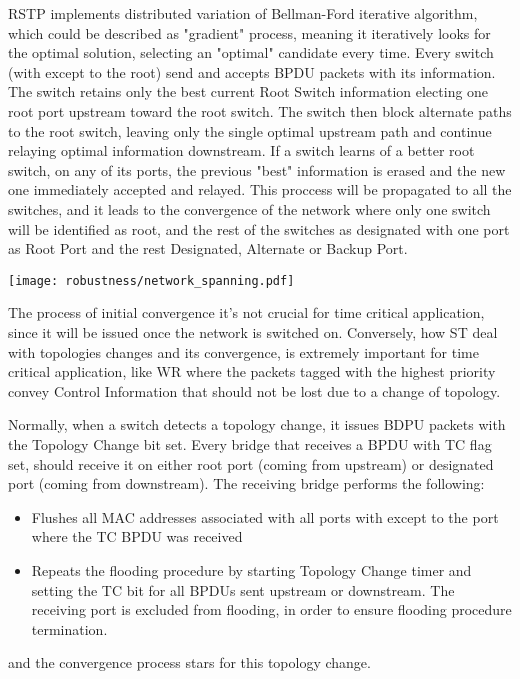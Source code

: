 RSTP implements distributed variation of Bellman-Ford iterative
algorithm, which could be described as "gradient" process, meaning it iteratively looks for the
optimal solution, selecting an "optimal" candidate every time. Every switch
(with except to the root) send and  accepts BPDU packets
with its information. The switch retains only the best current Root Switch
information electing one root port upstream toward the root switch. The switch
then block alternate paths to the root switch, leaving only the single optimal
upstream path and continue relaying optimal information downstream. If a switch
learns of a better root switch, on any of its ports, the previous "best"
information is erased and the new one immediately accepted and relayed. This
proccess will be propagated to all the switches, and it leads to the convergence
of the network where only one switch will be identified as root, and the rest of
the switches as designated with one port as Root Port and the rest Designated,
Alternate or Backup Port.


\begin{center}
        \texttt{[image: robustness/network\_spanning.pdf]}
        \label{fig:free_loops}
\end{center}

The process of initial convergence it's not crucial for time
critical application, since it will be issued once the network is switched on.
Conversely, how ST deal with topologies changes and its
convergence, is extremely important for time critical application, like WR where
the packets tagged with the highest priority convey Control Information that
should not be lost due to a change of topology.

Normally, when a switch detects a topology change, it issues BDPU packets with
the Topology Change bit set. Every bridge that receives a BPDU with TC flag set,
should  receive it on either root port (coming from upstream) or designated port
(coming from downstream). The receiving bridge performs the following:
\begin{itemize}

        \item Flushes all MAC addresses associated with all ports with except to
the port where the TC BPDU was received
        \item Repeats the flooding procedure by starting Topology Change timer
and setting the TC bit for all BPDUs sent upstream or downstream. The receiving
port is excluded from flooding, in order to ensure flooding procedure
termination.
\end{itemize}
and the convergence process stars for this topology change. 



